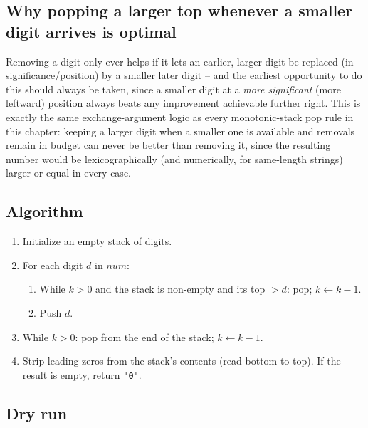 \subsection*{Why popping a larger top whenever a smaller digit arrives is optimal}

Removing a digit only ever helps if it lets an earlier, larger digit be
replaced (in significance/position) by a smaller later digit -- and the
earliest opportunity to do this should always be taken, since a smaller
digit at a \emph{more significant} (more leftward) position always
beats any improvement achievable further right. This is exactly the same
exchange-argument logic as every monotonic-stack pop rule in this
chapter: keeping a larger digit when a smaller one is available and
removals remain in budget can never be better than removing it, since the
resulting number would be lexicographically (and numerically, for
same-length strings) larger or equal in every case.

\subsection*{Algorithm}

\begin{enumerate}
  \item Initialize an empty stack of digits.
  \item For each digit $d$ in $\textit{num}$:
  \begin{enumerate}
    \item While $k>0$ and the stack is non-empty and its top $>d$: pop;
          $k \gets k-1$.
    \item Push $d$.
  \end{enumerate}
  \item While $k>0$: pop from the end of the stack; $k \gets k-1$.
  \item Strip leading zeros from the stack's contents (read bottom to
        top). If the result is empty, return \texttt{"0"}.
\end{enumerate}

\subsection*{Dry run}


